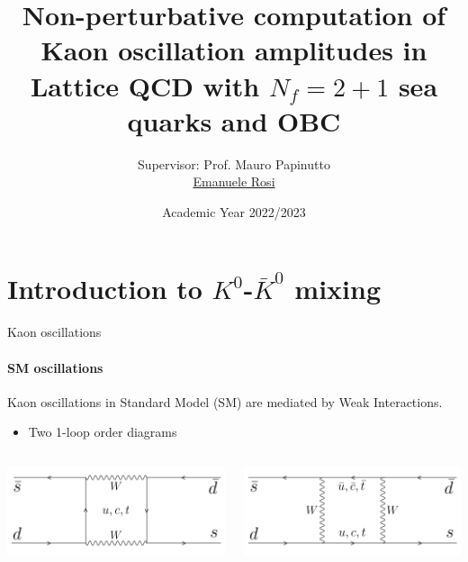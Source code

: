 \documentclass{beamer}
\title{Non-perturbative computation of Kaon oscillation amplitudes in Lattice QCD with $N_f = 2+1$ sea quarks and OBC}
\author{{\rm Supervisor: Prof.} Mauro Papinutto \\ \href{mailto:emanuele.rosi@roma1.infn.it}{Emanuele Rosi}}
\date{Academic Year 2022/2023}
\begin{document}
\maketitle

\section{Introduction to $K^0$-$\bar K^0$ mixing}

\begin{frame}{Kaon oscillations}
      \framesubtitle{SM oscillations}
      Kaon oscillations in Standard Model (SM) are mediated by Weak Interactions.
      \begin{itemize}
            \item Two 1-loop order diagrams
      \end{itemize}
      \vspace{\baselineskip}
      \begin{columns}
            \centering
            \begin{column}{0.5\textwidth}
                  \centering
                  \includegraphics[width=.8\textwidth,right]{assets/kkbar-1.png}
            \end{column}
            \begin{column}{0.5\textwidth}
                  \centering
                  \includegraphics[width=.8\textwidth,left]{assets/kkbar-2.png}
            \end{column}
      \end{columns}
\end{frame}
\end{document}
